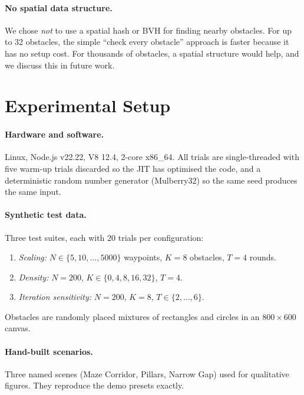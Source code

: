 \documentclass[10pt,a4paper,twocolumn]{article}
\begin{document}
\paragraph*{No spatial data structure.}
We chose \emph{not} to use a spatial hash or BVH for finding nearby
obstacles. For up to 32 obstacles, the simple ``check every obstacle''
approach is faster because it has no setup cost. For thousands of
obstacles, a spatial structure would help, and we discuss this in
future work.

\section{Experimental Setup}

\paragraph*{Hardware and software.}
Linux, Node.js v22.22, V8 12.4, 2-core x86\_64. All trials are
single-threaded with five warm-up trials discarded so the JIT has
optimised the code, and a deterministic random number generator
(Mulberry32) so the same seed produces the same input.

\paragraph*{Synthetic test data.}
Three test suites, each with 20 trials per configuration:
\begin{enumerate}
  \item \emph{Scaling:} $N \in \{5,10,\dots,5000\}$ waypoints,
        $K{=}8$ obstacles, $T{=}4$ rounds.
  \item \emph{Density:} $N{=}200$, $K \in \{0,4,8,16,32\}$, $T{=}4$.
  \item \emph{Iteration sensitivity:} $N{=}200$, $K{=}8$,
        $T \in \{2,\dots,6\}$.
\end{enumerate}
Obstacles are randomly placed mixtures of rectangles and circles in an
$800{\times}600$ canvas.

\paragraph*{Hand-built scenarios.}
Three named scenes (Maze Corridor, Pillars, Narrow Gap) used for
qualitative figures. They reproduce the demo presets exactly.
\end{document}
